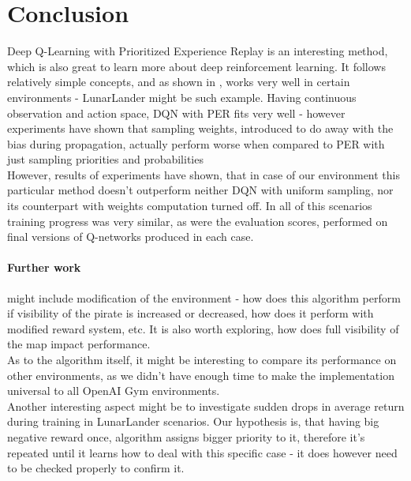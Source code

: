 \documentclass[a4paper,11pt]{article}
\theoremstyle{definition}
\begin{document}
\section{Conclusion}
Deep Q-Learning with Prioritized Experience Replay is an interesting method, which is also great to learn more about deep reinforcement learning. It follows relatively simple concepts, and as shown in \cite{schaul_2016}, works very well in certain environments - LunarLander might be such example. Having continuous observation and action space, DQN with PER fits very well - however experiments have shown that sampling weights, introduced to do away with the bias during propagation, actually perform worse when compared to PER with just sampling priorities and probabilities \\
However, results of experiments have shown, that in case of our environment this particular method doesn't outperform neither DQN with uniform sampling, nor its counterpart with weights computation turned off. In all of this scenarios training progress was very similar, as were the evaluation scores, performed on final versions of Q-networks produced in each case.

\paragraph{Further work} might include modification of the environment - how does this algorithm perform if visibility of the pirate is increased or decreased, how does it perform with modified reward system, etc. It is also worth exploring, how does full visibility of the map impact performance.\\
As to the algorithm itself, it might be interesting to compare its performance on other environments, as we didn't have enough time to make the implementation universal to all OpenAI Gym environments.\\
Another interesting aspect might be to investigate sudden drops in average return during training in LunarLander scenarios. Our hypothesis is, that having big negative reward once, algorithm assigns bigger priority to it, therefore it's repeated until it learns how to deal with this specific case - it does however need to be checked properly to confirm it.

\newpage
\end{document}
